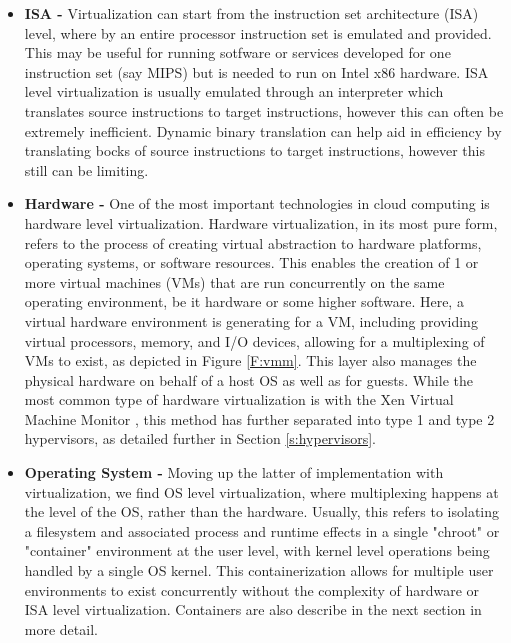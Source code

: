 \begin{itemize}

\item \textbf{ISA - }
Virtualization can start from the instruction set architecture (ISA) level, where by an entire processor instruction set is emulated and provided.  This may be useful for running sotfware or services developed for one instruction set (say MIPS) but is needed to run on Intel x86 hardware. ISA level virtualization is usually emulated through an interpreter which translates source instructions to target instructions, however this can often be extremely inefficient.  Dynamic binary translation can help aid in efficiency by translating bocks of source instructions to target instructions, however this still can be limiting.   

\item \textbf{Hardware - }
One of the most important technologies in cloud computing is hardware level virtualization\cite{Barham2003, ESX}. Hardware virtualization, in its most pure form, refers to the process of creating virtual abstraction to hardware platforms, operating systems, or software resources. This enables the creation of 1 or more virtual machines (VMs) that are run concurrently on the same operating environment, be it hardware or some higher software. Here, a virtual hardware environment is generating for a VM, including providing virtual processors, memory, and I/O devices, allowing for a multiplexing of VMs to exist, as depicted in Figure \ref{F:vmm}.  This layer also manages the physical hardware on behalf of a host OS as well as for guests. While the most common type of hardware virtualization is with the Xen Virtual Machine Monitor \cite{Barham2003}, this method has further separated into type 1 and type 2 hypervisors, as detailed further in Section \ref{s:hypervisors}.  

\item \textbf{Operating System - }
Moving up the latter of implementation with virtualization, we find OS level virtualization, where multiplexing happens at the level of the OS, rather than the hardware. Usually, this refers to isolating a filesystem and associated process and runtime effects in a single "chroot" or "container" environment at the user level, with kernel level operations being handled by a single OS kernel. This containerization allows for multiple user environments to exist concurrently without the complexity of hardware or ISA level virtualization.  Containers are also describe in the next section in more detail.


\end{itemize}

